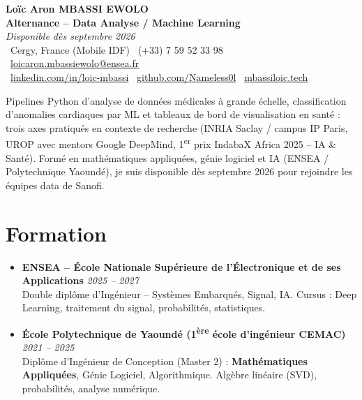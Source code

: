 \documentclass[a4paper,11pt]{article}
\begin{document}
\begin{center}
    {\Large \textbf{Loïc Aron MBASSI EWOLO}} \\ \vspace{4pt}
    \textbf{\large Alternance -- Data Analyse / Machine Learning} \\
    \textit{\small Disponible dès septembre 2026} \\ \vspace{4pt}
    \small
    \faMapMarker\ Cergy, France (Mobile IDF) \quad
    \faPhone\ (+33) 7 59 52 33 98 \quad
    \faEnvelope\ \href{mailto:loicaron.mbassiewolo@ensea.fr}{loicaron.mbassiewolo@ensea.fr} \\ \vspace{2pt}
    \faLinkedin\ \href{https://www.linkedin.com/in/loic-mbassi/}{linkedin.com/in/loic-mbassi} \quad
    \faGithub\ \href{https://github.com/Nameless0l}{github.com/Nameless0l} \quad
    \faGlobe\ \href{https://mbassiloic.tech}{mbassiloic.tech}
\end{center}

\vspace{-6pt}

\noindent\small{Pipelines Python d'analyse de données médicales à grande échelle, classification d'anomalies cardiaques par ML et tableaux de bord de visualisation en santé : trois axes pratiqués en contexte de recherche (INRIA Saclay / campus IP Paris, UROP avec mentors Google DeepMind, 1\textsuperscript{er} prix IndabaX Africa 2025 -- IA \& Santé). Formé en mathématiques appliquées, génie logiciel et IA (ENSEA / Polytechnique Yaoundé), je suis disponible dès septembre 2026 pour rejoindre les équipes data de Sanofi.}

\vspace{2pt}

\section{Formation}
\begin{itemize}[leftmargin=*, label=\tiny$\bullet$, nosep]
    \item \textbf{ENSEA -- École Nationale Supérieure de l'Électronique et de ses Applications} \hfill \textit{2025 -- 2027} \\
    \small{Double diplôme d'Ingénieur -- Systèmes Embarqués, Signal, IA. Cursus : Deep Learning, traitement du signal, probabilités, statistiques.}
    \item \textbf{École Polytechnique de Yaoundé (1\textsuperscript{ère} école d'ingénieur CEMAC)} \hfill \textit{2021 -- 2025} \\
    \small{Diplôme d'Ingénieur de Conception (Master 2) : \textbf{Mathématiques Appliquées}, Génie Logiciel, Algorithmique. Algèbre linéaire (SVD), probabilités, analyse numérique.}
\end{itemize}
\end{document}
